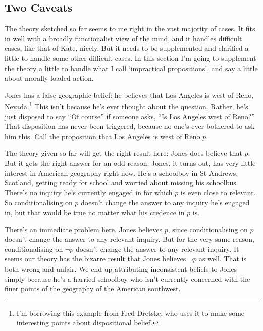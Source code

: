 \subsection{Two Caveats}
The theory sketched so far seems to me right in the vast majority of cases. It fits in well with a broadly functionalist view of the mind, and it handles difficult cases, like that of Kate, nicely. But it needs to be supplemented and clarified a little to handle some other difficult cases. In this section I'm going to supplement the theory a little to handle what I call `impractical propositions', and say a little about morally loaded action.

Jones has a false geographic belief: he believes that Los Angeles is west of Reno, Nevada.\footnote{I'm borrowing this example from Fred Dretske, who uses it to make some interesting points about dispositional belief.} This isn't because he's ever thought about the question. Rather, he's just disposed to say ``Of course'' if someone asks, ``Is Los Angeles west of Reno?'' That disposition has never been triggered, because no one's ever bothered to ask him this. Call the proposition that Los Angeles is west of Reno \(p\). 

The theory given so far will get the right result here: Jones does believe that \(p\). But it gets the right answer for an odd reason. Jones, it turns out, has very little interest in American geography right now. He's a schoolboy in St Andrews, Scotland, getting ready for school and worried about missing his schoolbus. There's no inquiry he's currently engaged in for which \(p\) is even close to relevant. So conditionalising on \(p\) doesn't change the answer to any inquiry he's engaged in, but that would be true no matter what his credence in \(p\) is.

There's an immediate problem here. Jones believes \(p\), since conditionalising on \(p\) doesn't change the answer to any relevant inquiry. But for the very same reason, conditionalising on \(\neg p\) doesn't change the answer to any relevant inquiry. It seems our theory has the bizarre result that Jones believes \(\neg p\) as well. That is both wrong and unfair. We end up attributing inconsistent beliefs to Jones simply because he's a harried schoolboy who isn't currently concerned with the finer points of the geography of the American southwest.

